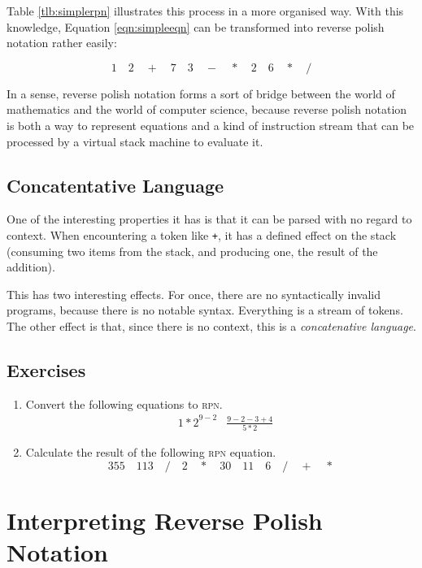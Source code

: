 \documentclass[a4paper,twocolumn]{article}
\begin{document}
Table \ref{tlb:simplerpn} illustrates this process in a more organised way. With this knowledge, Equation \ref{eqn:simpleeqn} can be transformed into reverse polish notation rather easily:

\begin{equation}
1\quad2\quad+\quad7\quad3\quad-\quad*\quad2\quad6\quad*\quad/  
\end{equation}

In a sense, reverse polish notation forms a sort of bridge between the world of mathematics and the world of computer science, because reverse polish notation is both a way to represent equations and a kind of instruction stream that can be processed by a virtual stack machine to evaluate it.

\subsection{Concatentative Language}

One of the interesting properties it has is that it can be parsed with no regard to context. When encountering a token like \verb|+|, it has a defined effect on the stack (consuming two items from the stack, and producing one, the result of the addition).

This has two interesting effects. For once, there are no syntactically invalid programs, because there is no notable syntax. Everything is a stream of tokens. The other effect is that, since there is no context, this is a \emph{concatenative language}. 

\subsection*{Exercises}

\begin{enumerate}
  \item Convert the following equations to \textsc{rpn}.
  \begin{align*}
    &{1 * 2}^{9 - 2} &
    \frac{9 - 2 - 3 + 4}{5 * 2}
  \end{align*}
  
  \item Calculate the result of the following \textsc{rpn} equation.
  \begin{equation*}
    355\quad113\quad/\quad2\quad*\quad30\quad11\quad6\quad/\quad+\quad*
  \end{equation*}
\end{enumerate}

\section{Interpreting Reverse Polish Notation}
\end{document}
